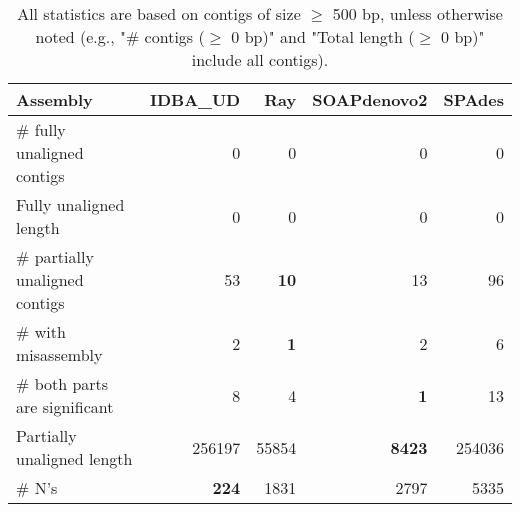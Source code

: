 \documentclass[12pt,a4paper]{article}
\begin{document}
\begin{table}[ht]
\begin{center}
\caption{All statistics are based on contigs of size $\geq$ 500 bp, unless otherwise noted (e.g., "\# contigs ($\geq$ 0 bp)" and "Total length ($\geq$ 0 bp)" include all contigs).}
\begin{tabular}{|l*{4}{|r}|}
\hline
Assembly & IDBA\_UD & Ray & SOAPdenovo2 & SPAdes \\ \hline
\# fully unaligned contigs & 0 & 0 & 0 & 0 \\ \hline
Fully unaligned length & 0 & 0 & 0 & 0 \\ \hline
\# partially unaligned contigs & 53 & {\bf 10} & 13 & 96 \\ \hline
\hspace{5mm}\# with misassembly & 2 & {\bf 1} & 2 & 6 \\ \hline
\hspace{5mm}\# both parts are significant & 8 & 4 & {\bf 1} & 13 \\ \hline
Partially unaligned length & 256197 & 55854 & {\bf 8423} & 254036 \\ \hline
\# N's & {\bf 224} & 1831 & 2797 & 5335 \\ \hline
\end{tabular}
\end{center}
\end{table}
\end{document}
